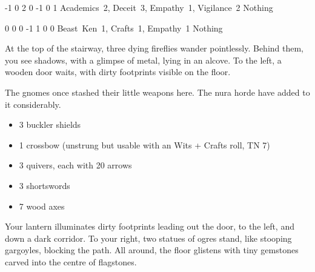 \begin{multicols}{2}
{-1}%
{0}%
{{2}%
{0}%
{-1}}%
{0}%
{1}%
{Academics~2, Deceit~3, Empathy~1, Vigilance~2}%
{Nothing}%
{}

{0}%
{0}%
{{0}%
{-1}%
{1}}%
{0}%
{0}%
{Beast~Ken~1, Crafts~1, Empathy~1}%
{Nothing}%
{}


\begin{boxtext}

	At the top of the stairway, three dying fireflies wander pointlessly.
	Behind them, you see shadows, with a glimpse of metal, lying in an alcove.
	To the left, a wooden door waits, with dirty footprints visible on the floor.

\end{boxtext}

\begin{exampletext}

	The gnomes once stashed their little weapons here.
	The nura horde have added to it considerably.

\end{exampletext}

\begin{itemize}

	\item{3 buckler shields}
	\item{1 crossbow (unstrung but usable with an Wits + Crafts roll, TN 7)}
	\item{3 quivers, each with 20 arrows}
	\iftoggle{hardcore}{%
		\item{3 crossbow bolts}
		\item{2 shortbows (also unstrung)}
	}{
		\item{8 crossbow bolts}
		\item{2 shortbows}
	}
	\item{3 shortswords}
	\item{7 wood axes}

\end{itemize}


\begin{boxtext}

	Your lantern illuminates dirty footprints leading out the door, to the left, and down a dark corridor.
	To your right, two statues of ogres stand, like stooping gargoyles, blocking the path.
	All around, the floor glistens with tiny gemstones carved into the centre of flagstones.


\end{boxtext}
\end{multicols}
